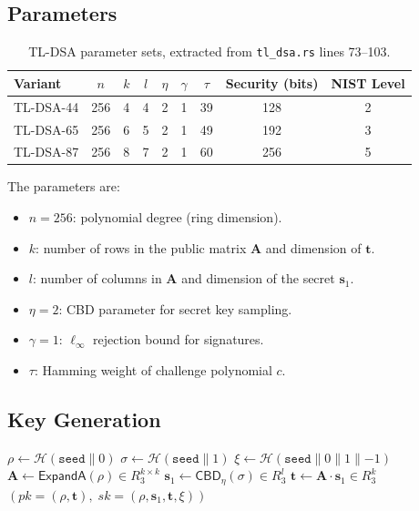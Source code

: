\documentclass[11pt,a4paper]{article}
\theoremstyle{definition}
\newcommand{\KeyGen}{\textsf{KeyGen}}
\begin{document}
\subsection{Parameters}

\begin{table}[ht]
\centering
\caption{TL-DSA parameter sets, extracted from \texttt{tl\_dsa.rs} lines 73--103.}
\label{tab:params}
\begin{tabular}{@{}lcccccccc@{}}
\toprule
Variant & $n$ & $k$ & $l$ & $\eta$ & $\gamma$ & $\tau$ & Security (bits) & NIST Level \\
\midrule
TL-DSA-44 & 256 & 4 & 4 & 2 & 1 & 39 & 128 & 2 \\
TL-DSA-65 & 256 & 6 & 5 & 2 & 1 & 49 & 192 & 3 \\
TL-DSA-87 & 256 & 8 & 7 & 2 & 1 & 60 & 256 & 5 \\
\bottomrule
\end{tabular}
\end{table}

\noindent The parameters are:
\begin{itemize}[leftmargin=2em]
\item $n = 256$: polynomial degree (ring dimension).
\item $k$: number of rows in the public matrix $\mathbf{A}$ and dimension of $\mathbf{t}$.
\item $l$: number of columns in $\mathbf{A}$ and dimension of the secret $\mathbf{s}_1$.
\item $\eta = 2$: CBD parameter for secret key sampling.
\item $\gamma = 1$: $\ell_\infty$ rejection bound for signatures.
\item $\tau$: Hamming weight of challenge polynomial $c$.
\end{itemize}

\subsection{Key Generation}

\begin{algorithm}[H]
\caption{$\KeyGen(\texttt{seed})$}
\label{alg:keygen}
\DontPrintSemicolon
$\rho \leftarrow \mathcal{H}(\texttt{seed} \| 0)$ 
$\sigma \leftarrow \mathcal{H}(\texttt{seed} \| 1)$ 
$\xi \leftarrow \mathcal{H}(\texttt{seed} \| 0 \| 1 \| {-1})$ 
$\mathbf{A} \leftarrow \textsf{ExpandA}(\rho) \in R_3^{k \times k}$ 
$\mathbf{s}_1 \leftarrow \textsf{CBD}_\eta(\sigma) \in R_3^l$ 
$\mathbf{t} \leftarrow \mathbf{A} \cdot \mathbf{s}_1 \in R_3^k$ 
\Return $\left(\textit{pk} = (\rho, \mathbf{t}),\; \textit{sk} = (\rho, \mathbf{s}_1, \mathbf{t}, \xi)\right)$
\end{algorithm}
\end{document}

